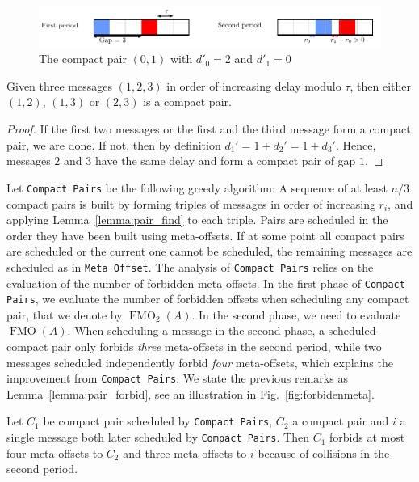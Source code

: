 \documentclass[a4paper,UKenglish,cleveref, autoref, thm-restate]{lipics-v2019}
\DeclareMathOperator{\Fmo}{FMO}
\newcommand\compactpair{\texttt{Compact Pairs}\xspace}
\newcommand\metaoffset{\texttt{Meta Offset}\xspace}
\begin{document}
\begin{figure}[h]
\begin{center}

\includegraphics[scale=0.7]{compact_pair}
\end{center}
\caption{The compact pair $(0,1)$ with $d'_0 = 2$ and $d'_1 = 0$}
\label{fig:compactpair}
\end{figure}

\begin{lemma}\label{lemma:pair_find}
Given three messages $(1,2,3)$ in order of increasing delay modulo $\tau$, then either $(1,2)$, $(1,3)$ or $(2,3)$ is a compact pair. 
\end{lemma}
\begin{proof}
If the first two messages or the first and the third message form a compact pair, we are done. If not, then by definition $d_{1}' = 1 + d_{2}' = 1 + d_{3}'$. Hence, messages $2$ and $3$ have the same delay and form a compact pair of gap $1$.
\end{proof}

Let \compactpair be the following greedy algorithm:  A sequence of at least $n/3$ compact pairs is built by forming triples of messages in order of increasing $r_i$, and applying Lemma~\ref{lemma:pair_find} to each triple. Pairs are scheduled in the order they have been built using meta-offsets. If at some point all compact pairs are scheduled or the current one cannot be scheduled, the remaining messages are scheduled as in \metaoffset. The analysis of \compactpair relies on the evaluation of the number of forbidden meta-offsets. In the first phase of \compactpair, we evaluate the number of forbidden offsets when scheduling any compact pair, that we denote by $\Fmo_2(A)$. In the second phase, we need to evaluate $\Fmo(A)$. When scheduling a message in the second phase, a scheduled compact pair only forbids \emph{three} meta-offsets in the second period, while two messages scheduled independently forbid \emph{four} meta-offsets, which explains the improvement from \compactpair. We state the previous remarks as Lemma~\ref{lemma:pair_forbid}, see an illustration in Fig.~\ref{fig:forbidenmeta}. 

\begin{lemma}\label{lemma:pair_forbid}
Let $C_1$ be compact pair scheduled by \compactpair, $C_2$ a compact pair and $i$ a single message both later scheduled by \compactpair.
Then $C_1$ forbids at most four meta-offsets to $C_2$ and three meta-offsets to $i$ because of collisions in the second period. 
\end{lemma}
\end{document}

